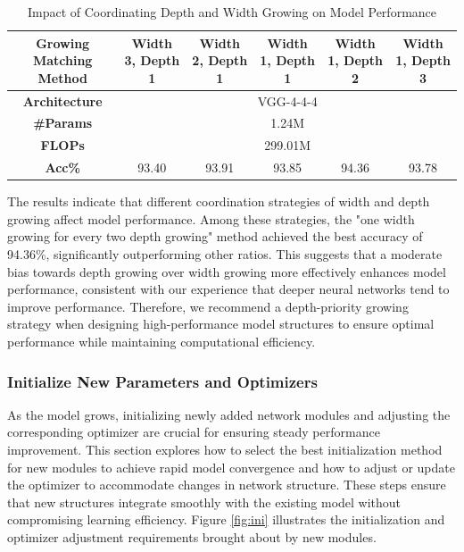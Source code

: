 \documentclass[preprint,12pt]{elsarticle}
\begin{document}
\begin{table}[ht]
\centering
\tiny
\renewcommand{\arraystretch}{1.3}
\begin{adjustbox}{center}
\begin{tabular}{c|ccccc}
\hline
\textbf{Growing Matching Method} & \textbf{Width 3, Depth 1} & \textbf{Width 2, Depth 1} & \textbf{Width 1, Depth 1} & \textbf{Width 1, Depth 2} & \textbf{Width 1, Depth 3} \\
\hline
\textbf{Architecture} & \multicolumn{5}{c}{VGG-4-4-4} \\
\hline
\textbf{\#Params} & \multicolumn{5}{c}{1.24M} \\
\hline
\textbf{FLOPs} & \multicolumn{5}{c}{299.01M} \\
\hline
\textbf{Acc\%} & 93.40 & 93.91 & 93.85 & 94.36 & 93.78 \\
\hline
\end{tabular}
\end{adjustbox}
\caption{Impact of Coordinating Depth and Width Growing on Model Performance}
\label{table:depth_width_matching}
\end{table}

The results indicate that different coordination strategies of width and depth growing affect model performance. Among these strategies, the "one width growing for every two depth growing" method achieved the best accuracy of 94.36\%, significantly outperforming other ratios. This suggests that a moderate bias towards depth growing over width growing more effectively enhances model performance, consistent with our experience that deeper neural networks tend to improve performance. Therefore, we recommend a depth-priority growing strategy when designing high-performance model structures to ensure optimal performance while maintaining computational efficiency.

\subsubsection{Initialize New Parameters and Optimizers}

As the model grows, initializing newly added network modules and adjusting the corresponding optimizer are crucial for ensuring steady performance improvement. This section explores how to select the best initialization method for new modules to achieve rapid model convergence and how to adjust or update the optimizer to accommodate changes in network structure. These steps ensure that new structures integrate smoothly with the existing model without compromising learning efficiency. Figure \ref{fig:ini} illustrates the initialization and optimizer adjustment requirements brought about by new modules.
\end{document}
